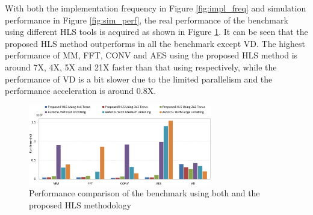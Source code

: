 With both the implementation frequency in Figure \ref{fig:impl_freq} and simulation performance in Figure \ref{fig:sim_perf}, the real performance of the benchmark using different HLS tools is acquired as shown in Figure \ref{fig:real_perf}. It can be seen that the proposed HLS method outperforms \autoesl in all the benchmark except VD. The highest performance of MM, FFT, CONV and AES using the proposed HLS method is around 7X, 4X, 5X and 21X faster than that using \autoesl respectively, while the performance of VD is a bit slower due to the limited parallelism and the performance acceleration is around 0.8X.


\begin{figure}[h]
\centering
\includegraphics[width=8cm]{real_perf}
\vspace{-1em}
\caption{Performance comparison of the benchmark using both \autoesl and the proposed HLS methodology}
\label{fig:real_perf}
\vspace{-1em}
\end{figure}
